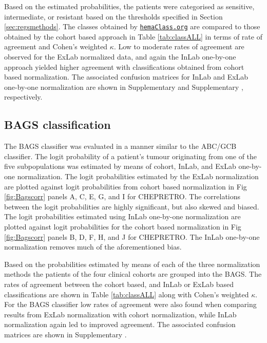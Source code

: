 \documentclass[10pt,letterpaper]{article}
\newcommand{\hemaClass}{\href{http://hemaClass.org}{\texttt{hemaClass.org}}}
\begin{document}
Based on the estimated probabilities, the patients were categorised as sensitive, intermediate, or resistant based on the thresholds specified in Section \ref{sec:regsmethods}.
The classes obtained by \hemaClass{} are compared to those obtained by the cohort based approach in Table \ref{tab:classALL} in terms of rate of agreement and Cohen's weighted $\kappa$. Low to moderate rates of agreement are observed for the ExLab normalized data, and again the InLab one-by-one approach yielded higher agreement with classifications obtained from cohort based normalization. 
The associated confusion matrices for InLab and ExLab one-by-one normalization are shown in
Supplementary  and
Supplementary , respectively.


\subsection*{BAGS classification}
The BAGS classifier was evaluated in a manner similar to the ABC/GCB classifier.
The logit probability of a patient's tumour originating from one of the five subpopulations was estimated by means of cohort, InLab, and ExLab one-by-one normalization.
The logit probabilities estimated by the ExLab normalization are plotted against logit probabilities from cohort based normalization in Fig \ref{fig:Bagscorr} panels A, C, E, G, and I for CHEPRETRO.
The correlations between the logit probabilities are highly significant, but also skewed and biased.
The logit probabilities estimated using InLab one-by-one normalization are plotted against logit probabilities for the cohort based normalization in Fig \ref{fig:Bagscorr} panels B, D, F, H, and J for CHEPRETRO.
The InLab one-by-one normalization removes much of the aforementioned bias.

Based on the probabilities estimated by means of each of the three normalization methods the patients of the four clinical cohorts are grouped into the BAGS.
The rates of agreement between the cohort based, and InLab or ExLab based classifications are shown in Table \ref{tab:classALL} along with Cohen's weighted $\kappa$. For the BAGS classifier low rates of agreement were also found when comparing results from ExLab normalization with cohort normalization, while InLab normalization again led to improved agreement. 
The associated confusion matrices are shown in Supplementary .
\end{document}
